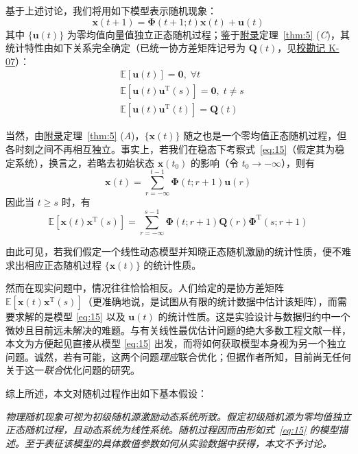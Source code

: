 基于上述讨论，我们将用如下模型表示随机现象：
\begin{equation}\label{eq:15}
\bm{x}(t + 1) = \bm{\Phi}(t + 1; t)\bm{x}(t) + \bm{u}(t)
\end{equation}
其中 $\{\bm{u}(t)\}$ 为零均值向量值独立正态随机过程；鉴于\hyperref[sec:appendix]{附录}定理~\ref{thm:5} (\emph{C})，其统计特性由如下关系完全确定（已统一协方差矩阵记号为 $\bm{Q}(t)$，见\hyperref[sec:k07]{校勘记 K-07}）：
\begin{equation*}
\begin{aligned}
&\mathbb{E}[\bm{u}(t)] = \bm{0},\; \forall t \\
&\mathbb{E}[\bm{u}(t)\bm{u}^{\mathrm{T}}(s)] = \bm{0},\; t \neq s \\
&\mathbb{E}[\bm{u}(t)\bm{u}^{\mathrm{T}}(t)] = \bm{Q}(t)
\end{aligned}
\end{equation*}

当然，由\hyperref[sec:appendix]{附录}定理~\ref{thm:5} (\emph{A})，$\{\bm{x}(t)\}$ 随之也是一个零均值正态随机过程，但各时刻之间不再相互独立。事实上，若我们在稳态下考察式~\eqref{eq:15}（假定其为稳定系统），换言之，若略去初始状态 $\bm{x}(t_0)$ 的影响（令 $t_0 \to -\infty$），则有
\begin{equation*}
\bm{x}(t) = \sum_{r=-\infty}^{t-1} \bm{\Phi}(t; r + 1)\bm{u}(r)
\end{equation*}
因此当 $t \geq s$ 时，有
\begin{equation*}
\mathbb{E}[\bm{x}(t)\bm{x}^{\mathrm{T}}(s)] = \sum_{r=-\infty}^{s-1} \bm{\Phi}(t; r + 1)\bm{Q}(r)\bm{\Phi}^{\mathrm{T}}(s; r + 1)
\end{equation*}

由此可见，若我们假定一个线性动态模型并知晓正态随机激励的统计性质，便不难求出相应正态随机过程 $\{\bm{x}(t)\}$ 的统计性质。

然而在现实问题中，情况往往恰恰相反。人们给定的是协方差矩阵 $\mathbb{E}[\bm{x}(t)\bm{x}^{\mathrm{T}}(s)]$（更准确地说，是试图从有限的统计数据中估计该矩阵），而需要求解的是模型 \eqref{eq:15} 以及 $\bm{u}(t)$ 的统计性质。这是实验设计与数据归约中一个微妙且目前远未解决的难题。与有关线性最优估计问题的绝大多数工程文献一样，本文为方便起见直接从模型 \eqref{eq:15} 出发，而将如何获取模型本身视为另一个独立问题。诚然，若有可能，这两个问题\emph{理应}联合优化；但据作者所知，目前尚无任何关于这一\emph{联合}优化问题的研究。

综上所述，本文对随机过程作出如下基本假设：

\emph{物理随机现象可视为初级随机源激励动态系统所致。假定初级随机源为零均值独立正态随机过程，且动态系统为线性系统。随机过程因而由形如式~\eqref{eq:15} 的模型描述。至于表征该模型的具体数值参数如何从实验数据中获得，本文不予讨论。}

